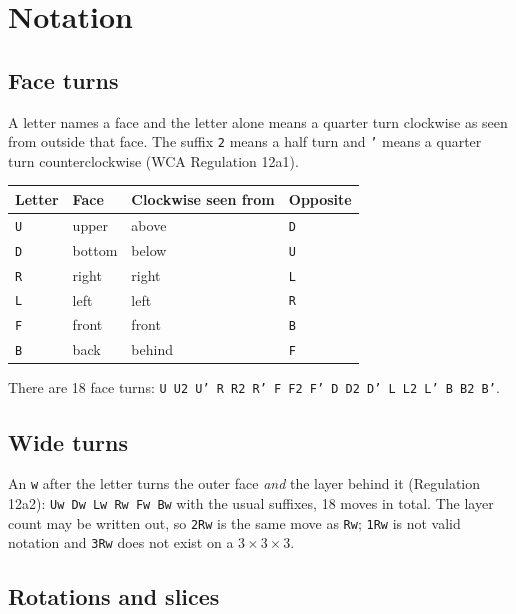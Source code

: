 \section{Notation}
\label{sec:notation}

\subsection{Face turns}

A letter names a face and the letter alone means a quarter turn clockwise as seen
from outside that face.  The suffix \texttt{2} means a half turn and \texttt{'}
means a quarter turn counterclockwise (WCA Regulation 12a1).

\begin{center}
\begin{tabular}{@{}llll@{}}
\toprule
Letter & Face & Clockwise seen from & Opposite \\
\midrule
\texttt{U} & upper        & above   & \texttt{D} \\
\texttt{D} & bottom       & below   & \texttt{U} \\
\texttt{R} & right        & right   & \texttt{L} \\
\texttt{L} & left         & left    & \texttt{R} \\
\texttt{F} & front        & front   & \texttt{B} \\
\texttt{B} & back         & behind  & \texttt{F} \\
\bottomrule
\end{tabular}
\end{center}

There are 18 face turns: \texttt{U U2 U' R R2 R' F F2 F' D D2 D' L L2 L' B B2 B'}.

\subsection{Wide turns}

An \texttt{w} after the letter turns the outer face \emph{and} the layer behind it
(Regulation 12a2): \texttt{Uw Dw Lw Rw Fw Bw} with the usual suffixes, 18 moves in
total.  The layer count may be written out, so \texttt{2Rw} is the same move as
\texttt{Rw}; \texttt{1Rw} is not valid notation and \texttt{3Rw} does not exist on a
$3\times3\times3$.

\subsection{Rotations and slices}


